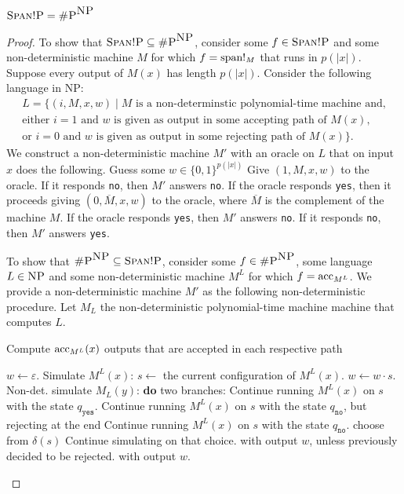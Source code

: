 \begin{theo}
	$\stspanp = \shp^{\np}$
\end{theo}
\begin{proof}
	To show that $\stspanp \subseteq \shp^{\np}$, consider some $f \in \stspanp$ and some non-deterministic machine $M$ for which $f = \sp!_M$ that runs in $p(\vert x\vert)$. Suppose every output of $M(x)$ has length $p(\vert x\vert)$. Consider the following language in NP:
	\begin{multline*}
		L = \{ (i,M,x,w) \mid M \text{ is a non-determinstic polynomial-time machine and,} \\ \text{either $i = 1$ and $w$ is given as output in some accepting path of $M(x)$}, \\ \text{or $i = 0$ and $w$ is given as output in some rejecting path of $M(x)$}\}.
	\end{multline*}
	 We construct a non-deterministic machine $M'$ with an oracle on $L$ that on input $x$ does the following. Guess some $w\in\{0,1\}^{p(\vert x\vert)}$ Give $(1,M,x,w)$ to the oracle. If it responds {\tt no}, then $M'$ answers {\tt no}. If the oracle responds {\tt yes}, then it proceeds giving $(0,\overline{M},x,w)$ to the oracle, where $\overline{M}$ is the complement of the machine $M$. If the oracle responds {\tt yes}, then $M'$ answers {\tt no}. If it responds {\tt no}, then $M'$ answers {\tt yes}.
	 
	 To show that $\shp^{\np} \subseteq \stspanp$, consider some $f \in \shp^{\np}$, some language $L\in\np$ and some non-deterministic machine $M^L$ for which $f = \acc_{M^L}$. We provide a non-deterministic machine $M'$ as the following non-deterministic procedure. Let $M_L$ the non-deterministic polynomial-time machine machine that computes $L$.
	 \begin{algorithm}
	 \caption{Compute $\acc_{M^L}(x)$ outputs that are accepted in each respective path}
	 \begin{algorithmic}[]
		 \Begin
		 \State $w \gets \varepsilon$.
		 \State Simulate $M^L(x)$:
		 \State $s\gets$ the current configuration of $M^L(x)$.
		 \State $w \gets w \cdot s$.
		 \State Non-det. simulate $M_L(y)$:
		  {\bf do} two branches:
		 \State Continue running $M^L(x)$ on $s$ with the state $q_{\texttt{yes}}$.
		 \State Continue running $M^L(x)$ on $s$ with the state $q_{\texttt{no}}$, but rejecting at the end
		 \EndInEach
		 \State Continue running $M^L(x)$ on $s$ with the state $q_{\texttt{no}}$.
		 \EndInEach
		  choose from $\delta(s)$
		 \State Continue simulating on that choice.
		 \State {} with output $w$, unless previously decided to be rejected.
		 \Else
		 \State {} with output $w$.
		 \EndIf
		 \EndWhile
		 \EndBegin
	 \end{algorithmic}
 	 \end{algorithm}
 	 

\end{proof}
